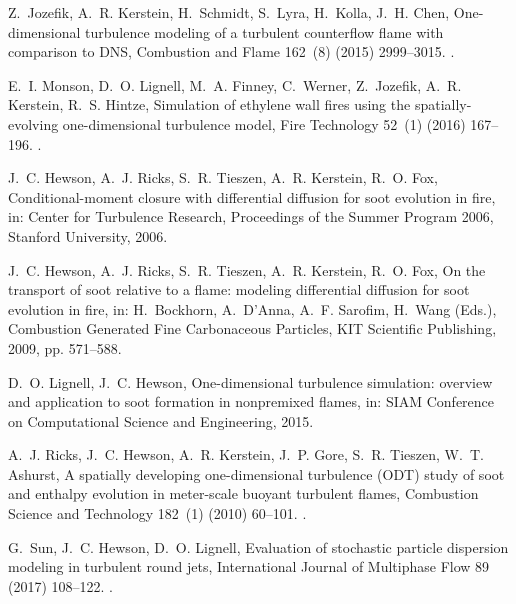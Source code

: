 \documentclass[preprint,12pt, a4paper]{elsarticle}
\begin{document}
\begin{thebibliography}{10}
Z.~Jozefik, A.~R. Kerstein, H.~Schmidt, S.~Lyra, H.~Kolla, J.~H. Chen,
  One-dimensional turbulence modeling of a turbulent counterflow flame with
  comparison to {DNS}, Combustion and Flame 162~(8) (2015) 2999--3015.
\newblock \href {http://dx.doi.org/10.1016/j.combustflame.2015.05.010}
  {}.

E.~I. Monson, D.~O. Lignell, M.~A. Finney, C.~Werner, Z.~Jozefik, A.~R.
  Kerstein, R.~S. Hintze, Simulation of ethylene wall fires using the
  spatially-evolving one-dimensional turbulence model, Fire Technology 52~(1)
  (2016) 167--196.
\newblock \href {http://dx.doi.org/10.1007/s10694-014-0441-2}
  {}.

J.~C. Hewson, A.~J. Ricks, S.~R. Tieszen, A.~R. Kerstein, R.~O. Fox,
  Conditional-moment closure with differential diffusion for soot evolution in
  fire, in: Center for Turbulence Research, Proceedings of the Summer Program
  2006, {Stanford University}, 2006.

J.~C. Hewson, A.~J. Ricks, S.~R. Tieszen, A.~R. Kerstein, R.~O. Fox, On the
  transport of soot relative to a flame: modeling differential diffusion for
  soot evolution in fire, in: H.~Bockhorn, A.~D'Anna, A.~F. Sarofim, H.~Wang
  (Eds.), Combustion Generated Fine Carbonaceous Particles, {KIT Scientific
  Publishing}, 2009, pp. 571--588.

D.~O. Lignell, J.~C. Hewson, One-dimensional turbulence simulation: overview
  and application to soot formation in nonpremixed flames, in: SIAM Conference
  on Computational Science and Engineering, 2015.

A.~J. Ricks, J.~C. Hewson, A.~R. Kerstein, J.~P. Gore, S.~R. Tieszen, W.~T.
  Ashurst, A spatially developing one-dimensional turbulence ({ODT}) study of
  soot and enthalpy evolution in meter-scale buoyant turbulent flames,
  Combustion Science and Technology 182~(1) (2010) 60--101.
\newblock \href {http://dx.doi.org/10.1080/00102200903297003}
  {}.

G.~Sun, J.~C. Hewson, D.~O. Lignell, Evaluation of stochastic particle
  dispersion modeling in turbulent round jets, International Journal of
  Multiphase Flow 89 (2017) 108--122.
\newblock \href {http://dx.doi.org/10.1016/j.ijmultiphaseflow.2016.10.005}
  {}.


\end{thebibliography}
\end{document}
